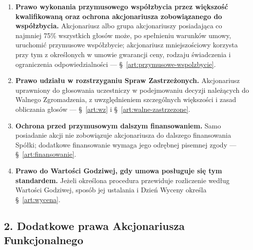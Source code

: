 \documentclass[12pt,a4paper]{report}
\begin{document}
\begin{enumerate}
  \item \textbf{Prawo wykonania przymusowego współzbycia przez większość kwalifikowaną oraz ochrona akcjonariusza zobowiązanego do współzbycia.} Akcjonariusz albo grupa akcjonariuszy posiadająca co najmniej 75\% wszystkich głosów może, po spełnieniu warunków umowy, uruchomić przymusowe współzbycie; akcjonariusz mniejszościowy korzysta przy tym z określonych w umowie gwarancji ceny, rodzaju świadczenia i ograniczenia odpowiedzialności --- §~\ref{art:przymusowe-wspolzbycie}.
  \item \textbf{Prawo udziału w rozstrzyganiu Spraw Zastrzeżonych.} Akcjonariusz uprawniony do głosowania uczestniczy w podejmowaniu decyzji należących do Walnego Zgromadzenia, z uwzględnieniem szczególnych większości i zasad obliczania głosów --- §~\ref{art:wz} i §~\ref{art:walne-zastrzezone}.
  \item \textbf{Ochrona przed przymusowym dalszym finansowaniem.} Samo posiadanie akcji nie zobowiązuje akcjonariusza do dalszego finansowania Spółki; dodatkowe finansowanie wymaga jego odrębnej pisemnej zgody --- §~\ref{art:finansowanie}.
  \item \textbf{Prawo do Wartości Godziwej, gdy umowa posługuje się tym standardem.} Jeżeli określona procedura przewiduje rozliczenie według Wartości Godziwej, sposób jej ustalania i Dzień Wyceny określa §~\ref{art:wycena}.
\end{enumerate}

\subsection*{2. Dodatkowe prawa Akcjonariusza Funkcjonalnego}
\end{document}

